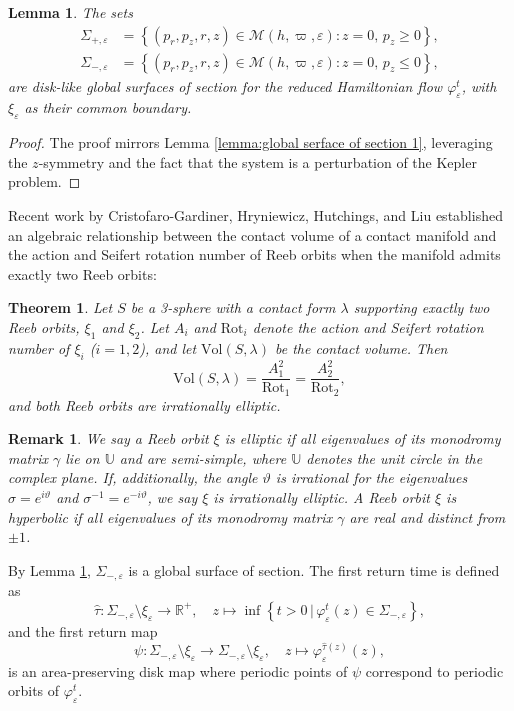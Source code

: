 \documentclass[11pt]{amsart}
\newcommand{\ep}{\varepsilon}
\newcommand{\om}{\varpi}
\newtheorem{thm}{Theorem}[section]
\newtheorem{lemma}{Lemma}[section]
\newtheorem{remark}{Remark}[section]
\begin{document}
\begin{lemma}\label{lemma:global serface of section}
	The sets  
	$$
	\begin{aligned}  
		\Sigma_{+,\ep} &= \left\{ (p_r, p_z, r, z) \in \mathcal{M}(h, \om, \ep) : z = 0, \, p_z \geq 0 \right\}, \\  
		\Sigma_{-,\ep} &= \left\{ (p_r, p_z, r, z) \in \mathcal{M}(h, \om, \ep) : z = 0, \, p_z \leq 0 \right\},  
	\end{aligned}  
	$$  
	are disk-like global surfaces of section for the reduced Hamiltonian flow \( \varphi_{\ep}^t \), with \( \xi_{\ep} \) as their common boundary.
\end{lemma}
\begin{proof}  
	The proof mirrors Lemma \ref{lemma:global serface of section 1}, leveraging the $ z $-symmetry and the fact that the system is a perturbation of the Kepler problem.  
\end{proof} 

Recent work by Cristofaro-Gardiner, Hryniewicz, Hutchings, and Liu \cite{CHHL23} established an algebraic relationship between the contact volume of a contact manifold and the action and Seifert rotation number of Reeb orbits when the manifold admits exactly two Reeb orbits:  
	\begin{thm}\label{thm:The condition of only two}  
		\cite[Theorem 1.2 and 1.5]{CHHL23} Let $ S $ be a 3-sphere with a contact form $ \lambda $ supporting exactly two Reeb orbits, $ \xi_1 $ and $ \xi_2 $. Let $ A_i $ and $ \text{Rot}_i $ denote the action and Seifert rotation number of $ \xi_i $ ($ i = 1, 2 $), and let $ \text{Vol}(S, \lambda) $ be the contact volume. Then  
		\begin{equation}\label{eq:Kepler equal}  
			\text{Vol}(S, \lambda) = \frac{A_1^2}{\text{Rot}_1} = \frac{A_2^2}{\text{Rot}_2},  
		\end{equation}  
		and both Reeb orbits are irrationally elliptic.  
	\end{thm} 
\begin{remark}
	 We say a Reeb orbit $\xi$ is elliptic if all eigenvalues of its monodromy matrix $\gamma$ lie on $\mathbb{U}$ and are semi-simple, where $\mathbb{U}$ denotes the unit circle in the complex plane. If, additionally, the angle $\vartheta$ is irrational for the eigenvalues $\sigma = e^{i\vartheta}$ and $\sigma^{-1} = e^{-i\vartheta}$, we say $\xi$ is irrationally elliptic. A Reeb orbit $\xi$ is hyperbolic if all eigenvalues of its monodromy matrix $\gamma$ are real and distinct from $\pm 1$. 
\end{remark}
By Lemma \ref{lemma:global serface of section}, $ \Sigma_{-,\ep} $ is a global surface of section. The first return time is defined as  
$$  
\hat{\tau}: \Sigma_{-,\ep} \setminus \xi_{\ep} \to \mathbb{R}^+, \quad z \mapsto \inf \left\{ t > 0 \, \big| \, \varphi_\ep^t(z) \in \Sigma_{-,\ep} \right\},  
$$  
and the first return map  
$$  
\psi: \Sigma_{-,\ep} \setminus \xi_{\ep} \to \Sigma_{-,\ep} \setminus \xi_{\ep}, \quad z \mapsto \varphi_\ep^{\hat{\tau}(z)}(z),  
$$  
is an area-preserving disk map where periodic points of $ \psi $ correspond to periodic orbits of $ \varphi_\ep^t $.
\end{document}
